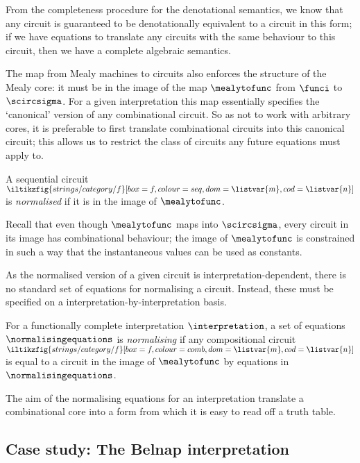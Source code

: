 From the completeness procedure for the denotational semantics, we know that any
circuit is guaranteed to be denotationally equivalent to a circuit in this form;
if we have equations to translate any circuits with the same behaviour to this
circuit, then we have a complete algebraic semantics.

The map from Mealy machines to circuits also enforces the structure of the
Mealy core: it must be in the image of the map \(\mealytofunc\) from \(\funci\)
to \(\scircsigma\).
For a given interpretation this map essentially specifies the `canonical'
version of any combinational circuit.
So as not to work with arbitrary cores, it is preferable to first translate
combinational circuits into this canonical circuit; this allows us to restrict
the class of circuits any future equations must apply to.

\begin{definition}
    A sequential circuit \(
        \iltikzfig{strings/category/f}[box=f,colour=seq,dom=\listvar{m},cod=\listvar{n}]
    \) is \emph{normalised} if it is in the image of \(\mealytofunc\).
\end{definition}

\begin{remark}
    Recall that even though \(\mealytofunc\) maps into \(\scircsigma\), every
    circuit in its image has combinational behaviour; the image of
    \(\mealytofunc\) is constrained in such a way that the instantaneous values
    can be used as constants.
\end{remark}

As the normalised version of a given circuit is interpretation-dependent, there
is no standard set of equations for normalising a circuit.
Instead, these must be specified on a interpretation-by-interpretation basis.

\begin{definition}
    For a functionally complete interpretation \(\interpretation\), a set of
    equations \(\normalisingequations\) is \emph{normalising} if any
    compositional circuit \(
        \iltikzfig{strings/category/f}[box=f,colour=comb,dom=\listvar{m},cod=\listvar{n}]
    \) is equal to a circuit in the image of \(\mealytofunc\) by equations in
    \(\normalisingequations\).
\end{definition}

The aim of the normalising equations for an interpretation translate a
combinational core into a form from which it is easy to read off a truth table.

\subsection{Case study: The Belnap interpretation}\label{sec:algebraic-case-study}

